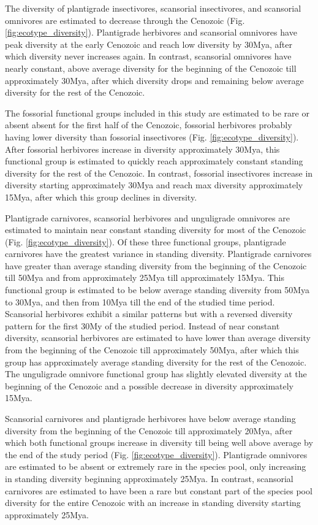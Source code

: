 \documentclass[12pt,letterpaper]{article}
\begin{document}
The diversity of plantigrade insectivores, scansorial insectivores, and scansorial omnivores are estimated to decrease through the Cenozoic (Fig. \ref{fig:ecotype_diversity}). Plantigrade herbivores and scansorial omnivores have peak diversity at the early Cenozoic and reach low diversity by 30Mya, after which diversity never increases again. In contrast, scansorial omnivores have nearly constant, above average diversity for the beginning of the Cenozoic till approximately 30Mya, after which diversity drops and remaining below average diversity for the rest of the Cenozoic.

The fossorial functional groups included in this study are estimated to be rare or absent absent for the first half of the Cenozoic, fossorial herbivores probably having lower diversity than fossorial insectivores (Fig. \ref{fig:ecotype_diversity}). After fossorial herbivores increase in diversity approximately 30Mya, this functional group is estimated to quickly reach approximately constant standing diversity for the rest of the Cenozoic. In contrast, fossorial insectivores increase in diversity starting approximately 30Mya and reach max diversity approximately 15Mya, after which this group declines in diversity.

Plantigrade carnivores, scansorial herbivores and unguligrade omnivores are estimated to maintain near constant standing diversity for most of the Cenozoic (Fig. \ref{fig:ecotype_diversity}). Of these three functional groups, plantigrade carnivores have the greatest variance in standing diversity. Plantigrade carnivores have greater than average standing diversity from the beginning of the Cenozoic till 50Mya and from approximately 25Mya till approximately 15Mya. This functional group is estimated to be below average standing diversity from 50Mya to 30Mya, and then from 10Mya till the end of the studied time period. Scansorial herbivores exhibit a similar patterns but with a reversed diversity pattern for the first 30My of the studied period. Instead of near constant diversity, scansorial herbivores are estimated to have lower than average diversity from the beginning of the Cenozoic till approximately 50Mya, after which this group has approximately average standing diversity for the rest of the Cenozoic. The unguligrade omnivore functional group has slightly elevated diversity at the beginning of the Cenozoic and a possible decrease in diversity approximately 15Mya. 

Scansorial carnivores and plantigrade herbivores have below average standing diversity from the beginning of the Cenozoic till approximately 20Mya, after which both functional groups increase in diversity till being well above average by the end of the study period (Fig. \ref{fig:ecotype_diversity}). Plantigrade omnivores are estimated to be absent or extremely rare in the species pool, only increasing in standing diversity beginning approximately 25Mya. In contrast, scansorial carnivores are estimated to have been a rare but constant part of the species pool diversity for the entire Cenozoic with an increase in standing diversity starting approximately 25Mya.
\end{document}
